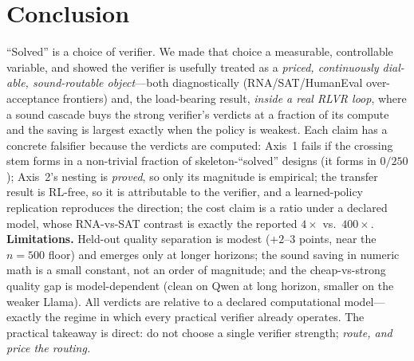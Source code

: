 \section{Conclusion}
``Solved'' is a choice of verifier. We made that choice a measurable, controllable variable, and showed the
verifier is usefully treated as a \emph{priced, continuously dial-able, sound-routable object}---both
diagnostically (RNA/SAT/HumanEval over-acceptance frontiers) and, the load-bearing result, \emph{inside a real
RLVR loop}, where a sound cascade buys the strong verifier's verdicts at a fraction of its compute and the
saving is largest exactly when the policy is weakest. Each claim has a concrete falsifier because the verdicts
are computed: Axis~1 fails if the crossing stem forms in a non-trivial fraction of skeleton-``solved'' designs
(it forms in $0/250$); Axis~2's nesting is \emph{proved}, so only its magnitude is empirical; the transfer
result is RL-free, so it is attributable to the verifier, and a learned-policy replication reproduces the
direction; the cost claim is a ratio under a declared model, whose RNA-vs-SAT contrast is exactly the reported
$4\times$ vs.\ $400\times$. \textbf{Limitations.} Held-out quality separation is modest ($+2$--$3$ points,
near the $n{=}500$ floor) and emerges only at longer horizons; the sound saving in numeric math is a small
constant, not an order of magnitude; and the cheap-vs-strong quality gap is model-dependent (clean on Qwen at
long horizon, smaller on the weaker Llama). All verdicts
are relative to a declared computational model---exactly the regime in which every practical verifier already
operates. The practical takeaway is direct: do not choose a single verifier strength; \emph{route, and price
the routing.}
